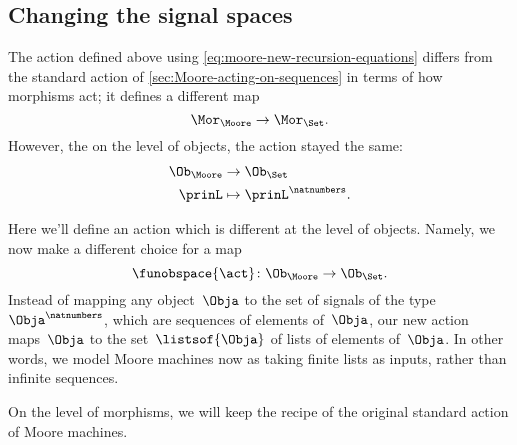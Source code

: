 
\subsection{Changing the signal spaces}

The action defined above using \cref{eq:moore-new-recursion-equations} differs from the standard action of \cref{sec:Moore-acting-on-sequences} in terms of how morphisms act; it defines a different map
\begin{equation*}
    \Mor_\Moore \to \Mor_\Set.
\end{equation*}
However, the on the level of objects, the action stayed the same:
\begin{equation*}
    \begin{aligned}
        \Ob_{\Moore} & \to \Ob_{\Set} \\
        \prinL       & \mapsto \prinL^\natnumbers.
    \end{aligned}
\end{equation*}

Here we'll define an action which is different at the level of objects.
Namely, we now make a different choice for a map
\begin{equation*}
    \funobspace{\act} \colon \Ob_{\Moore} \to \Ob_{\Set}.
\end{equation*}
Instead of mapping any object~$\Obja$ to the set of signals of the type~$\Obja^\natnumbers$, which are sequences of elements of~$\Obja$, our new action maps~$\Obja$ to the set~$\listsof{\Obja}$ of lists of elements of~$\Obja$.
In other words, we model Moore machines now as taking finite lists as inputs, rather than infinite sequences.

On the level of morphisms, we will keep the recipe of the original standard action of Moore machines.

